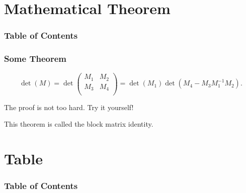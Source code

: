 \documentclass{beamer}
\theoremstyle{plain}
\begin{document}
\section{Mathematical Theorem}
\begin{frame}
\frametitle{Table of Contents}
\tableofcontents[currentsection]
\end{frame}

\begin{frame}
\frametitle{Some Theorem}
\begin{theorem}
$$
\det(M) = \det
\left(
\begin{array}{cc}
M_1 & M_2 \\
M_3 & M_4 \\
\end{array}
\right)
= \det(M_1)\det(M_4 - M_3M_1^{-1}M_2).
$$
\end{theorem}

\begin{Proof}
The proof is not too hard. Try it yourself!
\end{Proof}

\begin{block}
This theorem is called the block matrix identity.
\end{block}
\end{frame}


\section{Table}
\begin{frame}
\frametitle{Table of Contents}
\tableofcontents[currentsection]
\end{frame}
\end{document}
